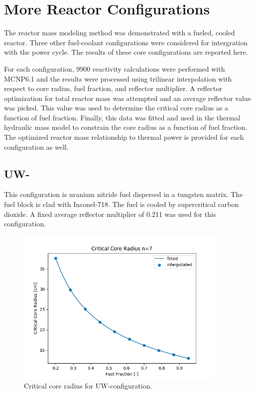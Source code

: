 \chapter{More Reactor Configurations}\label{ch:appendix-a}

The reactor mass modeling method was demonstrated with a \uox fueled, \codiox
cooled reactor. Three other fuel-coolant configurations were considered for
intergration with the power cycle. The results of these core configurations are
reported here.

For each configuration, 9900 reactivity calculations were performed with
MCNP6.1 and the \keff results were processed using trilinear interpolation with
respect to core radius, fuel fraction, and reflector multiplier. A reflector
optimization for total reactor mass was attempted and an average reflector value
was picked. This value was used to determine the critical core radius as a
function of fuel fraction. Finally, this data was fitted and used in the thermal
hydraulic mass model to constrain the core radius as a function of fuel
fraction. The optimized reactor mass relationship to thermal power is 
provided for each configuration as well.

\clearpage
\section{UW-\codiox}
This configuration is uranium nitride fuel dispersed in a tungsten matrix. The
fuel block is clad with Inconel-718. The
fuel is cooled by supercritical carbon dioxide. A fixed average reflector
multiplier of 0.211 was used for this configuration.

\begin{figure}[h]
    \centering
    \includegraphics[width=4in]{../images/core_r_un_co2.png}
\caption{Critical core radius for UW-\codiox configuration.}
\label{fig:core_r_un_co2}
\end{figure}

